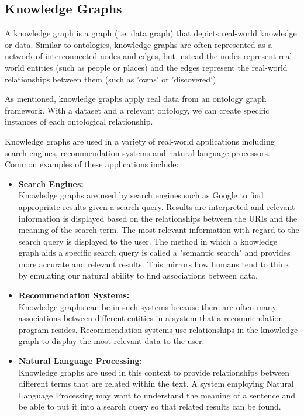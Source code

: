 \subsection{Knowledge Graphs}
\hspace{0.5cm} A knowledge graph is a graph (i.e. data graph) that depicts real-world knowledge or data. \cite{knowledgegraph} Similar to ontologies, knowledge graphs are often represented as a network of interconnected nodes and edges, but instead the nodes represent real-world entities (such as people or places) and the edges represent the real-world relationships between them (such as 'owns' or 'discovered'). 

As mentioned, knowledge graphs apply real data from an ontology graph framework. With a dataset and a relevant ontology, we can create specific instances of each ontological relationship. 

Knowledge graphs are used in a variety of real-world applications including search engines, recommendation systems and natural language processors. Common examples of these applications include:

\begin{itemize}
\item \textbf{Search Engines:} \\Knowledge graphs are used by search engines such as Google to find appropriate results given a search query. Results are interpreted and relevant information is displayed based on the relationships between the URIs and the meaning of the search term. The most relevant information with regard to the search query is displayed to the user. The method in which a knowledge graph aids a specific search query is called a "semantic search" and provides more accurate and relevant results. This mirrors how humans tend to think by emulating our natural ability to find associations between data.  \cite{searchengine}  

\item \textbf{Recommendation Systems:} \\Knowledge graphs can be in such systems because there are often many associations between different entities in a system that a recommendation program resides. Recommendation systems use relationships in the knowledge graph to display the most relevant data to the user. 

\item \textbf{Natural Language Processing:}\\ Knowledge graphs are used in this context to provide relationships between different terms that are related within the text. A system employing Natural Language Processing may want to understand the meaning of a sentence and be able to put it into a search query so that related results can be found. 

\end{itemize}

